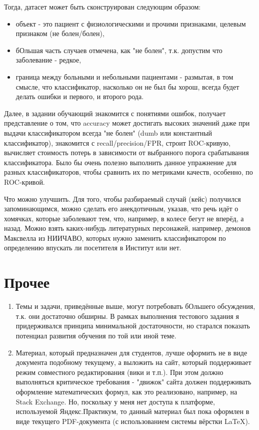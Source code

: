 \documentclass[a4paper,12pt]{article}
\begin{document}
Тогда, датасет может быть сконструирован следующим образом:

\begin{itemize}
\item объект - это пациент с физиологическими и прочими признаками, целевым признаком (не болен/болен),
\item бОльшая часть случаев отмечена, как "не болен", т.к. допустим что заболевание - редкое,
\item граница между больными и небольными пациентами - размытая, в том смысле, что классификатор, насколько он не был бы хорош, всегда будет делать ошибки и первого, и второго рода.
\end{itemize}

Далее, в задании обучающий знакомится с понятиями ошибок, получает представление о том, что accuracy может достигать высоких значений даже при выдачи классификатором всегда "не болен" (dumb или константный классификатор), знакомится с recall/precision/FPR, строит ROC-кривую, вычисляет стоимость потерь в зависимости от выбранного порога срабатывания классификатора. Было бы очень полезно выполнить данное упражнение для разных классификаторов, чтобы сравнить их по метриками качеств, особенно, по ROC-кривой.

{\color{red} \faLightbulbO} Что можно улучшить. Для того, чтобы разбираемый случай (кейс) получился запоминающимся, можно сделать его анекдотичным, указав, что речь идёт о хомячках, которые заболевают тем, что, например, в колесе бегут не вперёд, а назад. Можно взять каких-нибудь литературных персонажей, например, демонов Максвелла из НИИЧАВО, которых нужно заменить классификатором по определению впускать ли посетителя в Институт или нет.

\appendix

\section{Прочее}

\begin{enumerate}
\item Темы и задачи, приведённые выше, могут потребовать бОльшего обсуждения, т.к. они достаточно обширны. В рамках выполнения тестового задания я придерживался принципа минимальной достаточности, но старался показать потенциал развития обучения по той или иной теме.
\item Материал, который предназначен для студентов, лучше оформить не в виде документа подобному текущему, а выложить на сайт, который поддерживает режим совместного редактирования (вики и т.п.). При этом должно выполняться критическое требования - "движок" сайта должен поддерживать оформление математических формул, как это реализовано, например, на Stack Exchange. Но, поскольку у меня нет доступа к платформе, используемой Яндекс.Практикум, то данный материал был пока оформлен в виде текущего PDF-документа (с использованием системы вёрстки \LaTeX).
\end{enumerate}
\end{document}
